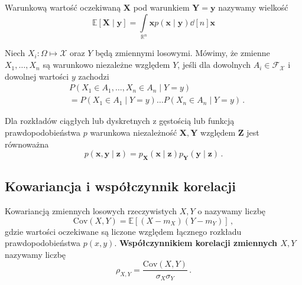 \documentclass{myclass}
\numberwithin{equation}{section}
\begin{document}
\begin{definition}
Warunkową wartość oczekiwaną \(\mathbf{X}\) pod warunkiem \(\mathbf{Y} = \mathbf{y}\) nazywamy
wielkość
\begin{equation*}
    \mathbb{E}[\mathbf{X} \mid \mathbf{y}] = \int\limits_{\mathbb{R}^n} \mathbf{x} p(\mathbf{x} \mid \mathbf{y}) \dd[n]{\mathbf{x}}
\end{equation*}
\end{definition}

\begin{definition}
Niech \(X_i : \Omega \mapsto \mathcal{X}\) oraz \(Y\) będą zmiennymi losowymi. Mówimy, że zmienne
\(X_1,\ldots,X_n\) są warunkowo niezależne względem \(Y\), jeśli dla dowolnych \(A_i \in
\mathcal{F}_\mathcal{X}\) i dowolnej wartości \(y\) zachodzi
\begin{equation*}
    \begin{split}
        &P(X_1\in A_1,\ldots,X_n\in A_n \mid Y = y) \\
        &= P(X_1 \in A_1 \mid Y = y)\ldots P(X_n \in A_n \mid Y = y)\,.
    \end{split}
\end{equation*}  
\end{definition}

Dla rozkładów ciągłych lub dyskretnych z gęstością lub funkcją prawdopodobieństwa \(p\) warunkowa
niezależność \(\mathbf{X}, \mathbf{Y}\) względem \(\mathbf{Z}\) jest równoważna
\begin{equation*}
    p(\mathbf{x},\mathbf{y} \mid \mathbf{z}) = p_\mathbf{X}(\mathbf{x} \mid \mathbf{z})p_\mathbf{Y}(\mathbf{y} \mid \mathbf{z})\,.
\end{equation*}


\subsection{Kowariancja i współczynnik korelacji}

\begin{definition}[Kowariancji]
Kowariancją zmiennych losowych rzeczywistych \(X, Y\) o nazywamy liczbę
\begin{equation*}
    \mathrm{Cov}(X, Y) = \mathbb{E}[(X - m_X)(Y - m_Y)]\,,
\end{equation*}
gdzie wartości oczekiwane są liczone względem łącznego rozkładu prawdopodobieństwa \(p(x,y)\).
\textbf{Współczynnikiem korelacji zmiennych \(X, Y\)} nazywamy liczbę
\begin{equation*}
    \rho_{X,Y} = \frac{\mathrm{Cov}(X, Y)}{\sigma_X \sigma_Y}\,.
\end{equation*}
\end{definition}
\end{document}
